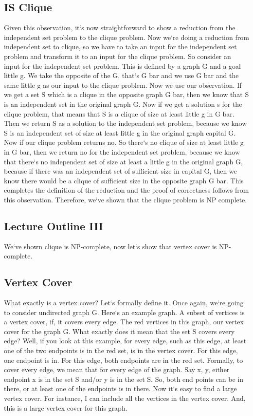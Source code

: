 \subsection{IS Clique}
Given this observation, it`s now straightforward to show a reduction from the independent set problem to the clique problem.
Now we`re doing a reduction from independent set to clique, so we have to take an input for the independent set problem and transform it to an input for the clique problem.
So consider an input for the independent set problem.
This is defined by a graph G and a goal little g.
We take the opposite of the G, that`s G bar and we use G bar and the same little g as our input to the clique problem.
Now we use our observation.
If we get a set S which is a clique in the opposite graph G bar, then we know that S is an independent set in the original graph G\@.
Now if we get a solution s for the clique problem, that means that S is a clique of size at least little g in G bar.
Then we return S as a solution to the independent set problem, because we know S is an independent set of size at least little g in the original graph capital G\@.
Now if our clique problem returns no.
So there`s no clique of size at least little g in G bar, then we return no for the independent set problem, because we know that there`s no independent set of size at least a little g in the original graph G, because if there was an independent set of sufficient size in capital G, then we know there would be a clique of sufficient size in the opposite graph G bar.
This completes the definition of the reduction and the proof of correctness follows from this observation.
Therefore, we`ve shown that the clique problem is NP complete.

\subsection{Lecture Outline III}
We`ve shown clique is NP-complete, now let`s show that vertex cover is NP-complete.

\subsection{Vertex Cover}
What exactly is a vertex cover? Let`s formally define it.
Once again, we`re going to consider undirected graph G\@.
Here`s an example graph.
A subset of vertices is a vertex cover, if, it covers every edge.
The red vertices in this graph, our vertex cover for the graph G\@.
What exactly does it mean that the set S covers every edge? Well, if you look at this example, for every edge, such as this edge, at least one of the two endpoints is in the red set, is in the vertex cover.
For this edge, one endpoint is in.
For this edge, both endpoints are in the red set.
Formally, to cover every edge, we mean that for every edge of the graph.
Say x, y, either endpoint x is in the set S and/or y is in the set S\@.
So, both end points can be in there, or at least one of the endpoints is in there.
Now it`s easy to find a large vertex cover.
For instance, I can include all the vertices in the vertex cover.
And, this is a large vertex cover for this graph.

